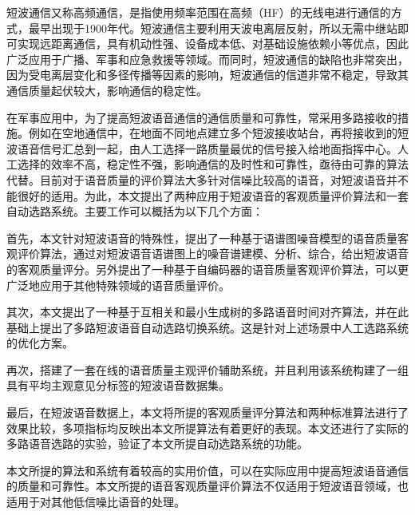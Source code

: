 \begin{cabstract}

  短波通信又称高频通信，是指使用频率范围在高频（HF）的无线电进行通信的方式，最早出现于1900年代。短波通信主要利用天波电离层反射，所以无需中继站即可实现远距离通信，具有机动性强、设备成本低、对基础设施依赖小等优点，因此广泛应用于广播、军事和应急救援等领域。而同时，短波通信的缺陷也非常突出，因为受电离层变化和多径传播等因素的影响，短波通信的信道非常不稳定，导致其通信质量起伏较大，影响通信的稳定性。
  
  在军事应用中，为了提高短波语音通信的通信质量和可靠性，常采用多路接收的措施。例如在空地通信中，在地面不同地点建立多个短波接收站台，再将接收到的短波语音信号汇总到一起，由人工选择一路质量最优的信号接入给地面指挥中心。人工选择的效率不高，稳定性不强，影响通信的及时性和可靠性，亟待由可靠的算法代替。目前对于语音质量的评价算法大多针对信噪比较高的语音，对短波语音并不能很好的适用。为此，本文提出了两种应用于短波语音的客观质量评价算法和一套自动选路系统。主要工作可以概括为以下几个方面：

  首先，本文针对短波语音的特殊性，提出了一种基于语谱图噪音模型的语音质量客观评价算法，通过对短波语音语谱图上的噪音谱建模、分析、综合，给出短波语音的客观质量评分。另外提出了一种基于自编码器的语音质量客观评价算法，可以更广泛地应用于其他特殊领域的语音质量评价。

  其次，本文提出了一种基于互相关和最小生成树的多路语音时间对齐算法，并在此基础上提出了多路短波语音自动选路切换系统。这是针对上述场景中人工选路系统的优化方案。

  再次，搭建了一套在线的语音质量主观评价辅助系统，并且利用该系统构建了一组具有平均主观意见分标签的短波语音数据集。

  最后，在短波语音数据上，本文将所提的客观质量评分算法和两种标准算法进行了效果比较，多项指标均反映出本文所提算法有着更好的表现。本文还进行了实际的多路语音选路的实验，验证了本文所提自动选路系统的功能。

  本文所提的算法和系统有着较高的实用价值，可以在实际应用中提高短波语音通信的质量和可靠性。本文所提的语音客观质量评价算法不仅适用于短波语音领域，也适用于对其他低信噪比语音的处理。

\end{cabstract}


